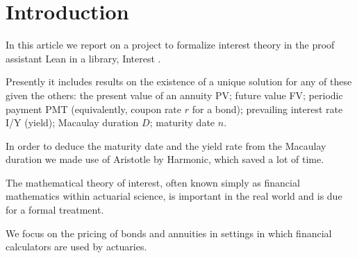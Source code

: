 
\begin{abstract}
Standard actuarial education includes an exam on financial mathematics, specifically the mathematical theory of interest rates.
In this article we describe a project taking the first steps toward formalizing this
theory in the proof assistant \textsc{Lean}.
As Lean's Mathlib library already has a thorough coverage of calculus, we are able to develop the theory of interest directly.

We start with the Annuity Equation, a staple of actuarial science and financial mathematics, relating a payment, present value, future value, interest rate, and maturity date.
Using the Lean proof assistant, we verify the unique solvability of the Annuity Equation for each variable under reasonable assumptions.
We next do the same for a Macaulay duration equation, with some help from Harmonic's mathematical superintelligence tool \textsc{Aristotle}.

Finally, using Radisic's verified numerical computation tool \textsc{LeanCert}, we are able to formally prove the correctness
of solutions to actuarial exam questions having numerical answers.
\end{abstract}

\section{Introduction}
	In this article we report on a project to formalize interest theory in the proof assistant Lean \cite{demoura21lean4}
	in a library, Interest \cite{interest}.

Presently it includes results on the existence of a unique solution for any of these given the others: the present value of an annuity PV; future value FV; periodic payment PMT (equivalently, coupon rate $r$ for a bond); prevailing interest rate I/Y (yield); Macaulay duration $D$; maturity date $n$.

In order to deduce the maturity date and the yield rate from the Macaulay duration we made use of Aristotle \cite{achim2025aristotleimolevelautomatedtheorem} by Harmonic, which saved a lot of time.

	The mathematical theory of interest, often known simply as financial mathematics within actuarial science,
	is important in the real world and is due for a formal treatment.
	
	We focus on the pricing of bonds and annuities in settings in which financial calculators are used by actuaries.


